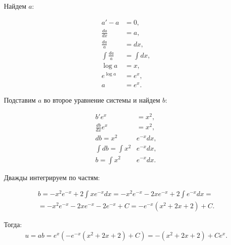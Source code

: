 \begin{enumerate}[label=\textbf{\arabic*})]
        Найдем $a$:

        \begin{equation*}
            \begin{aligned}
                a' - a &= 0,\\
                \frac{da}{dx} &= a,\\
                \frac{da}{a} &= dx,\\
                \int\frac{da}{a} &= \int dx,\\
                \log a &= x,\\
                e^{\log a} &= e^x,\\
                a &= e^x.
            \end{aligned}
        \end{equation*}

        Подставим $a$ во второе уравнение системы и найдем $b$:

        \begin{equation*}
            \begin{aligned}
                b'e^x &= x^2,\\
                \frac{db}{dx}e^x &= x^2,\\
                db = x^2 & e^{-x} dx,\\
                \int db = \int x^2 & e^{-x} dx,\\
                b = \int x^2 & e^{-x} dx.
            \end{aligned}
        \end{equation*}

        Дважды интегрируем по частям:

        \begin{equation*}
            \begin{split}
                b = -x^2 e^{-x} + 2\int xe^{-x} dx = -x^2e^{-x} -2xe^{-x} +
                2\int e^{-x} dx = \\ = -x^2 e^{-x} - 2xe^{-x} - 2e^{-x} + C =
                -e^{-x}(x^2 + 2x + 2) + C.
            \end{split}
        \end{equation*}

        Тогда:
        \begin{equation*}
            \begin{split}
                u = ab = e^x(-e^{-x}(x^2 + 2x + 2) + C) = -(x^2 + 2x + 2) + Ce^x.
            \end{split}
        \end{equation*}


\end{enumerate}
